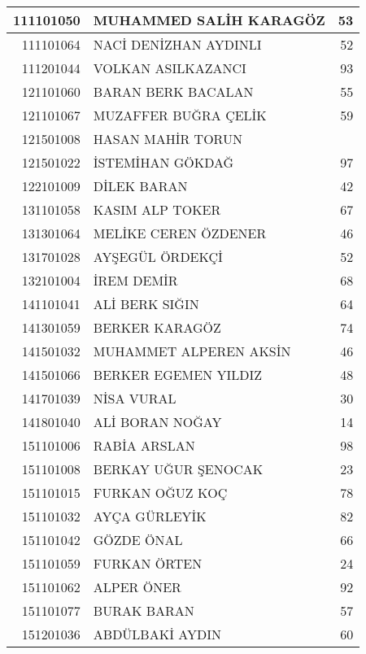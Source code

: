 \documentclass[12pt]{article}
\begin{document}
\begin{longtable}{||r||l||r||}
    \midrule
    111101050 & MUHAMMED SALİH KARAGÖZ & 53 \\
    \midrule
    111101064 & NACİ DENİZHAN AYDINLI & 52 \\
    \midrule
    111201044 & VOLKAN ASILKAZANCI & 93 \\
    \midrule
    121101060 & BARAN BERK BACALAN & \cellcolor[rgb]{ 1,  1,  0} 55 \\
    \midrule
    121101067 & MUZAFFER BUĞRA ÇELİK & 59 \\
    \midrule
    121501008 & HASAN MAHİR TORUN &  \\
    \midrule
    121501022 & İSTEMİHAN GÖKDAĞ & 97 \\
    \midrule
    122101009 & DİLEK BARAN & 42 \\
    \midrule
    131101058 & KASIM ALP TOKER & 67 \\
    \midrule
    131301064 & MELİKE CEREN ÖZDENER & 46 \\
    \midrule
    131701028 & AYŞEGÜL ÖRDEKÇİ & 52 \\
    \midrule
    132101004 & İREM DEMİR & 68 \\
    \midrule
    141101041 & ALİ BERK SIĞIN & 64 \\
    \midrule
    141301059 & BERKER KARAGÖZ & \cellcolor[rgb]{ 1,  1,  0} 74 \\
    \midrule
    141501032 & MUHAMMET ALPEREN AKSİN & 46 \\
    \midrule
    141501066 & BERKER EGEMEN YILDIZ & 48 \\
    \midrule
    141701039 & NİSA VURAL & 30 \\
    \midrule
    141801040 & ALİ BORAN NOĞAY & 14 \\
    \midrule
    151101006 & RABİA ARSLAN & 98 \\
    \midrule
    151101008 & BERKAY UĞUR ŞENOCAK & 23 \\
    \midrule
    151101015 & FURKAN OĞUZ KOÇ & 78 \\
    \midrule
    151101032 & AYÇA GÜRLEYİK & 82 \\
    \midrule
    151101042 & GÖZDE ÖNAL & \cellcolor[rgb]{ 1,  1,  0} 66 \\
    \midrule
    151101059 & FURKAN ÖRTEN & 24 \\
    \midrule
    151101062 & ALPER ÖNER & 92 \\
    \midrule
    151101077 & BURAK BARAN & 57 \\
    \midrule
    151201036 & ABDÜLBAKİ AYDIN & 60 \\

\end{longtable}
\end{document}
